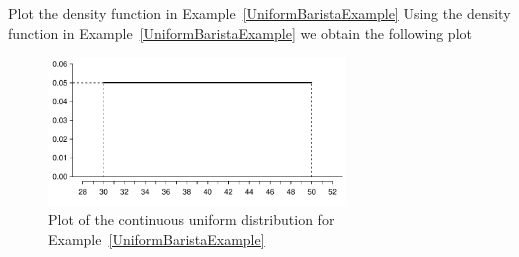 \begin{example}{Plot the density function in Example~\ref{UniformBaristaExample}}
Using the density function in Example~\ref{UniformBaristaExample} we obtain the following plot
\vspace{-0.25cm}
\begin{figure}[H]
\centering
\includegraphics[width=0.7\textwidth]{03/figures2/barista/baristaUniformPDF/uniformBarista.pdf}
\caption{Plot of the continuous uniform distribution for Example~\ref{UniformBaristaExample} }
\label{uniformDistBarista}
\end{figure}
\end{example}


